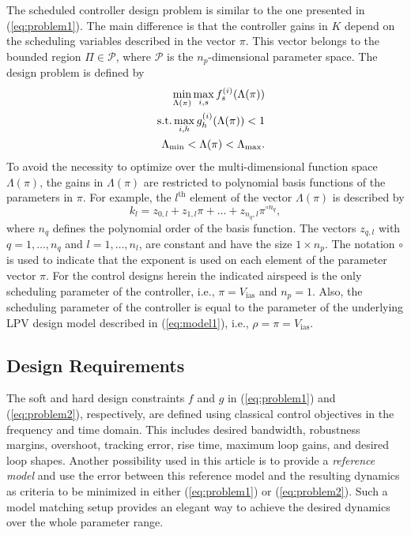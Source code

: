 \documentclass[aerospace,article,submit,moreauthors,pdftex,10pt,a4paper]{Definitions/mdpi}
\begin{document}
The scheduled controller design problem \cite{Apkarian15} is similar to the one presented in (\ref{eq:problem1}). The main difference is that the controller gains in $K$ depend on the scheduling variables  described in the vector $\pi$. This vector belongs to the bounded region  $\Pi \in \mathcal{P}$, where $\mathcal{P}$ is the $n_p$-dimensional parameter space. The design problem is defined by
\begin{eqnarray}\label{eq:problem2}
&&\min_{\Lambda(\pi)} \max_{i,s} f_{s}^{(i)}(\Lambda(\pi)) \\
&&\textnormal{s.t.} \max_{i,h} g_{h}^{(i)}(\Lambda(\pi)) < 1 \nonumber \\
&& \Lambda_{\min} < \Lambda(\pi) < \Lambda_{\max}. \nonumber 
\end{eqnarray}
To avoid the necessity to optimize over the multi-dimensional function space $\Lambda(\pi)$, the gains in $\Lambda(\pi)$ are restricted to polynomial basis functions of the parameters in $\pi$. For example, the $l^{\text{th}}$ element of the vector $\Lambda(\pi)$ is described by
\begin{equation}\label{eq:basisf}
k_l = z_{0,l} + z_{1,l} \pi + \dots + z_{n_q,l} \pi^{\circ n_q},
\end{equation}
where $n_q$ defines the  polynomial order of the basis function. The vectors $z_{q,l}$ with $q = 1,\dots,n_q$ and $l = 1,\dots, n_l$, are constant and have the size $1 \times n_p$. The notation $\circ$ is used to indicate that the exponent is used on each element of the parameter vector $\pi$. For the control designs herein the indicated airspeed is the only  scheduling parameter of the controller, i.e., $\pi = V_{\text{ias}}$ and $n_p = 1$. Also, the scheduling parameter of the controller is equal to the  parameter of the underlying LPV design model described in (\ref{eq:model1}), i.e., $\rho = \pi = V_{\text{ias}}$. 


\subsection{Design Requirements}
The soft and hard design constraints $f$ and $g$ in (\ref{eq:problem1}) and (\ref{eq:problem2}), respectively,  are defined using classical control objectives in the frequency and time domain. This includes desired bandwidth, robustness margins, overshoot, tracking error, rise time, maximum loop gains, and desired loop shapes.
Another possibility used in this article is to provide a \textit{reference model} and use the error between this reference model and the resulting dynamics as criteria to be minimized in either (\ref{eq:problem1}) or (\ref{eq:problem2}). Such a model matching setup provides an elegant way to achieve the desired dynamics
over the whole parameter range.
\end{document}
